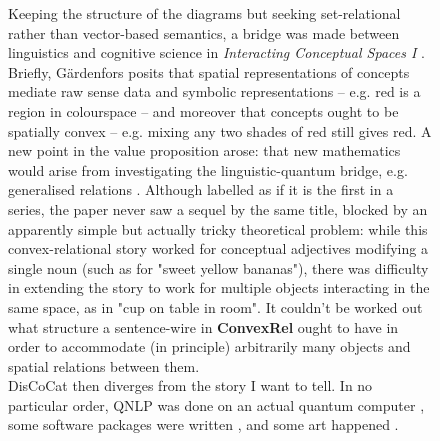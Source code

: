 \begin{figure}[h!]
\centering
{}
\caption{Keeping the structure of the diagrams but seeking set-relational rather than vector-based semantics, a bridge was made between linguistics and cognitive science in \emph{Interacting Conceptual Spaces I} \citep{bolt_interacting_2017}. Briefly, G\"{a}rdenfors posits \citep{gardenfors_geometry_2014} that spatial representations of concepts mediate raw sense data and symbolic representations -- e.g. red is a region in colourspace -- and moreover that concepts ought to be spatially convex -- e.g. mixing any two shades of red still gives red. A new point in the value proposition arose: that new mathematics would arise from investigating the linguistic-quantum bridge, e.g. generalised relations \citep{marsden_custom_2017}. Although labelled as if it is the first in a series, the paper never saw a sequel by the same title, blocked by an apparently simple but actually tricky theoretical problem: while this convex-relational story worked for conceptual adjectives modifying a single noun (such as for "sweet yellow bananas"), there was difficulty in extending the story to work for multiple objects interacting in the same space, as in "cup on table in room". It couldn't be worked out what structure a sentence-wire in \textbf{ConvexRel} ought to have in order to accommodate (in principle) arbitrarily many objects and spatial relations between them.\\

DisCoCat then diverges from the story I want to tell. In no particular order, QNLP was done on an actual quantum computer \citep{lorenz_qnlp_2023}, some software packages were written \citep{kartsaklis_lambeq_2023}, and some art happened \citep{a_quantum_computer_ludovico_nodate}.}
\end{figure}
\clearpage



